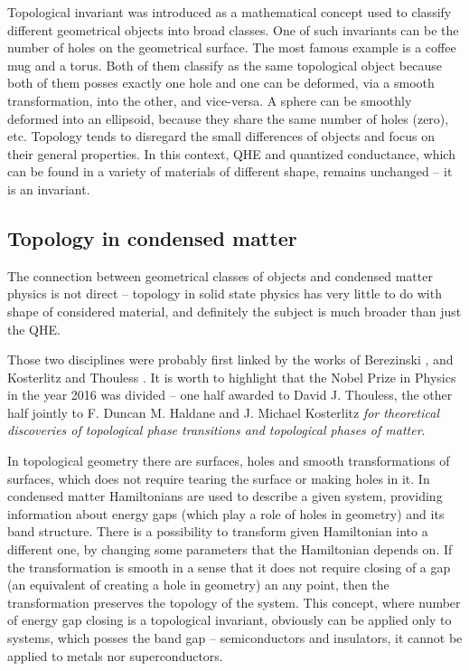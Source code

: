 \documentclass[titlepage,a4paper]{book}
\newcommand{\wciecie}{\quad\phantom{v}}
\begin{document}
Topological invariant was introduced as a mathematical concept used to classify different geometrical objects into broad classes. One of such invariants can be the number of holes on the geometrical surface. The most famous example is a coffee mug and a torus. Both of them classify as the same topological object because both of them posses exactly one hole and one can be deformed, via a smooth transformation, into the other, and vice-versa. A sphere can be smoothly deformed into an ellipsoid, because they share the same number of holes (zero), etc. Topology tends to disregard the small differences of objects and focus on their general properties. In this context, QHE and quantized conductance, which can be found in a variety of materials of different shape, remains unchanged -- it is an invariant. 
 
\subsection{Topology in condensed matter}
\wciecie
The connection between geometrical classes of objects and condensed matter physics is not direct -- topology in solid state physics has very little to do with shape of considered material, and definitely the subject is much broader than just the QHE. 

Those two disciplines were probably first linked by the works of Berezinski \cite{Berezinski1}\cite{Berezinski2}, and Kosterlitz and Thouless \cite{Thouless_nobel}. It is worth to highlight that the Nobel Prize in Physics in the year 2016 was divided -- one half awarded to David J. Thouless, the other half jointly to F. Duncan M. Haldane and J. Michael Kosterlitz \textit{for theoretical discoveries of topological phase transitions and topological phases of matter}.

In topological geometry there are surfaces, holes and smooth transformations of surfaces, which does not require tearing the surface or making holes in it. In condensed matter Hamiltonians are used to describe a given system, providing information about energy gaps (which play a role of holes in geometry) and its band structure. There is a possibility to transform given Hamiltonian into a different one, by changing some parameters that the Hamiltonian depends on. If the transformation is smooth in a sense that it does not require closing of a gap (an equivalent of creating a hole in geometry) an any point, then the transformation preserves the topology of the system. This concept, where number of energy gap closing is a topological invariant, obviously can be applied only to systems, which posses the band gap -- semiconductors and insulators, it cannot be applied to metals nor superconductors. 
\end{document}
